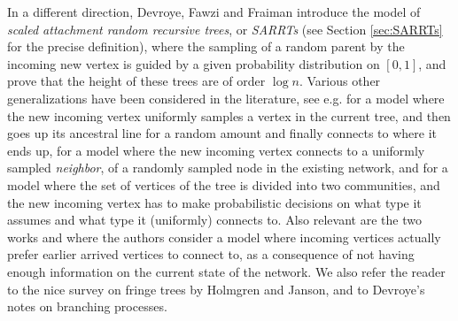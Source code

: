 \documentclass[letterpaper,11pt,reqno]{amsart}
\theoremstyle{definition}
\begin{document}
{In a different direction, Devroye, Fawzi and Fraiman \cite{devroye2012depth} introduce the model of \emph{scaled attachment random recursive trees}, or \emph{SARRTs} (see Section \ref{sec:SARRTs} for the precise definition), where the sampling of a random parent by the incoming new vertex is guided by a given probability distribution on $[0,1]$, and prove that the height of these trees are of order $\log n$. Various other generalizations have been considered in the literature, see e.g. \cite{banerjee2024co} for a model where the new incoming vertex uniformly samples a vertex in the current tree, and then goes up its ancestral line for a random amount and finally connects to where it ends up, \cite{addario2024random} for a model where the new incoming vertex connects to a uniformly sampled \emph{neighbor}, of a randomly sampled node in the existing network, and \cite{bhamidi2022community} for a model where the set of vertices of the tree is divided into two communities, and the new incoming vertex has to make probabilistic decisions on what type it assumes and what type it (uniformly) connects to. Also relevant are the two works \cite{BBDS04_macro} and \cite{BBDS04_meso} where the authors consider a model where incoming vertices actually prefer earlier arrived vertices to connect to, as a consequence of not having enough information on the current state of the network. We also refer the reader to the nice survey \cite{holmgren2017fringe} on fringe trees by Holmgren and Janson, and to Devroye's notes \cite{devroye1998branching} on branching processes.}
\end{document}
